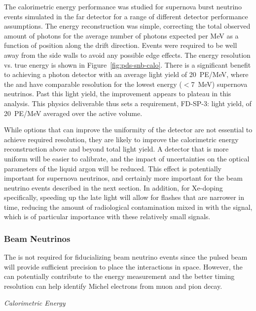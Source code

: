 The calorimetric energy performance was studied for supernova burst neutrino events simulated in the far detector for a range of different detector performance assumptions. The energy reconstruction was simple, correcting the total observed amount of photons for the average number of photons expected per MeV as a function of position along the drift direction. Events were required to be well away from the side walls to avoid any possible edge effects. The energy resolution vs. true energy is shown in Figure~\ref{fig:pds-snb-calo}. There is a significant benefit to achieving a photon detector with an average light yield of \SI{20}{PE/MeV}, where the  and  have comparable resolution for the lowest energy ($<$\SI{7}{MeV}) supernova neutrinos. Past this light yield, the improvement appears to plateau in this analysis. This physics deliverable thus sets a requirement, FD-SP-3: light yield, of \SI{20}{PE/MeV} averaged over the active volume.

While options that can improve the uniformity of the detector are not essential to achieve required resolution, they are likely to improve the calorimetric energy reconstruction above and beyond total light yield. A detector that is more uniform will be easier to calibrate, and the impact of uncertainties on the optical parameters of the liquid argon will be reduced. This effect is potentially important for supernova neutrinos, and certainly more important for the beam neutrino events described in the next section. In addition, for Xe-doping specifically, speeding up the late light will allow for flashes that are narrower in time, reducing the amount of radiological contamination mixed in with the signal, which is of particular importance with these relatively small signals.



\subsubsection{Beam Neutrinos}
\label{subsec:fdsp-pd-simphys-beam}

The  is not required for fiducializing beam neutrino events since the pulsed beam will provide sufficient precision to place the interactions in space. However, the  can potentially contribute to the energy measurement and the better timing resolution can help identify Michel electrons from muon and pion decay.


\textit{Calorimetric Energy}\nopagebreak

